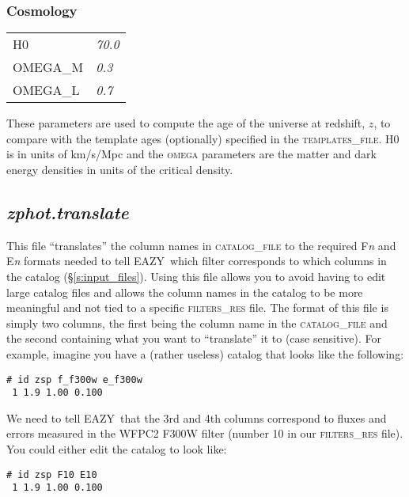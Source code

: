 \documentclass[11pt]{article}
\newcommand{\eazy}{\textsc{EAZY}}
\begin{document}
\subsubsection{Cosmology}
\begin{tabular}{ll}
 \textsc{H0               } & \textsl{    70.0               } \\
 \textsc{OMEGA\_M         } & \textsl{     0.3               } \\
 \textsc{OMEGA\_L       } & \textsl{        0.7               }
\end{tabular}

\vspace*{0.25cm} These parameters are used to compute the age of the universe
at redshift, $z$, to compare with the template ages (optionally) specified in
the \textsc{templates\_file}.  \textsc{H0} is in units of km/s/Mpc and the
\textsc{omega} parameters are the matter and dark energy densities in units of
the critical density.

    \subsection{\textit{zphot.translate} \label{s:translate}}

	This file ``translates'' the column names in
	\textsc{catalog\_file} to the required F\textsl{n} and
	E\textsl{n} formats needed to tell \eazy\ which filter
	corresponds to which columns in the catalog
	(\S\ref{s:input_files}).  Using this file allows you to
	avoid having to edit large catalog files and allows the
	column names in the catalog to be more meaningful and
	not tied to a specific \textsc{filters\_res} file.  The
	format of this file is simply two columns, the first
	being the column name in the \textsc{catalog\_file} and
	the second containing what you want to ``translate'' it
	to (case sensitive).  For example, imagine you have a
	(rather useless) catalog that looks like the following:

\texttt{\# id   zsp    f\_f300w   e\_f300w }\\
\texttt{\   1   1.9     1.00       0.100 }

We need to tell \eazy\ that the 3rd and 4th columns
correspond to fluxes and errors measured in the WFPC2 F300W
filter (number 10 in our \textsc{filters\_res} file).  You
could either edit the catalog to look like:

\texttt{\# id   zsp      F10        E10 }\\
\texttt{\   1   1.9     1.00       0.100 }
\end{document}
